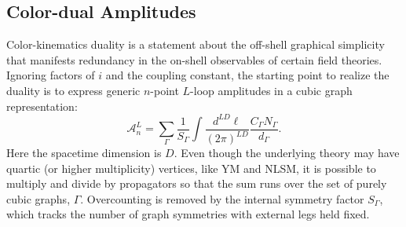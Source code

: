 \documentclass[11pt,letter]{article}
\begin{document}
\subsection{Color-dual Amplitudes}\label{onShellCK}

Color-kinematics duality is a statement about the off-shell graphical
simplicity that manifests redundancy in the on-shell observables of
certain field theories. Ignoring factors of $i$ and the coupling
constant, the starting point to realize the duality is to express generic $n$-point $L$-loop amplitudes in a cubic graph representation:
\begin{equation}
  \mathcal{A}_n^L = \sum \limits_\Gamma \frac{1}{S_\Gamma} \int \frac{d^{LD}\ell}{(2\pi)^{LD}} \frac{C_\Gamma N_\Gamma}{d_\Gamma} .
  \label{eq:gen-amp}
\end{equation}
Here the spacetime dimension is $D$.  Even though the underlying
theory may have quartic (or higher multiplicity) vertices, like YM and NLSM, it is
possible to multiply and divide by propagators so that the sum runs
over the set of purely cubic graphs, $\Gamma$.  Overcounting is removed by
the internal symmetry factor $S_\Gamma$, which tracks the number of
graph symmetries with external legs held fixed.  
\end{document}
